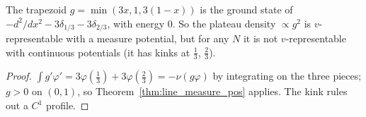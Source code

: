 \begin{theorem}
  \label{thm:line_measure_trap}
  \leanok
  The trapezoid $g=\min(3x,1,3(1-x))$ is the ground state of $-d^2/dx^2-3\delta_{1/3}-3\delta_{2/3}$, with energy $0$. So the
  plateau density $\propto g^2$ is $v$-representable with a measure potential, but for any $N$ it is not $v$-representable
  with continuous potentials (it has kinks at $\tfrac13$, $\tfrac23$).
\end{theorem}
\begin{proof}
  \leanok
  $\int g'\varphi'=3\varphi(\tfrac13)+3\varphi(\tfrac23)=-\nu(g\varphi)$ by integrating on the three pieces; $g>0$ on $(0,1)$, so
  Theorem~\ref{thm:line_measure_pos} applies. The kink rules out a $C^1$ profile.
\end{proof}

